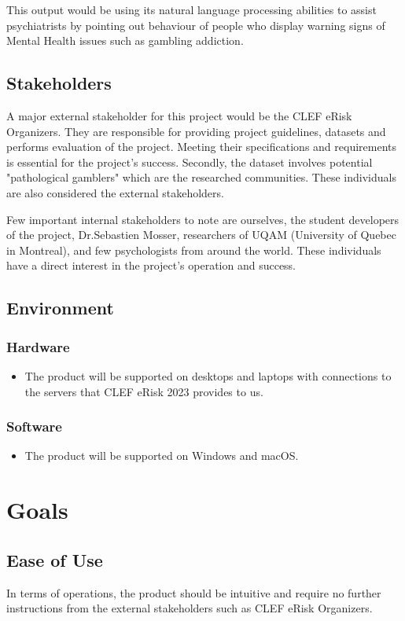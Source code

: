 \documentclass{article}
\begin{document}
This output would be using its natural language processing abilities to assist psychiatrists by pointing out behaviour of people who display warning signs of Mental Health issues such as gambling addiction.

\subsection{Stakeholders}
A major external stakeholder for this project would be the CLEF eRisk Organizers. They are responsible for providing project guidelines, datasets and performs evaluation of the project. Meeting their specifications and requirements is essential for the project's success. Secondly, the dataset involves potential "pathological gamblers" which are the researched communities. These individuals are also considered the external stakeholders.

Few important internal stakeholders to note are ourselves, the student developers of the project, Dr.Sebastien Mosser, researchers of UQAM (University of Quebec in Montreal), and few psychologists from around the world. These individuals have a direct interest in the project's operation and success.

\subsection{Environment}
\subsubsection{Hardware}
\begin{itemize}
    \item The product will be supported on desktops and laptops with connections to the servers that CLEF eRisk 2023 provides to us. 
\end{itemize}

\subsubsection{Software}
\begin{itemize}
    \item The product will be supported on Windows and macOS. 
\end{itemize}

\section{Goals}
\subsection{Ease of Use}
In terms of operations, the product should be intuitive and require no further instructions from the external stakeholders such as CLEF eRisk Organizers.
\end{document}
